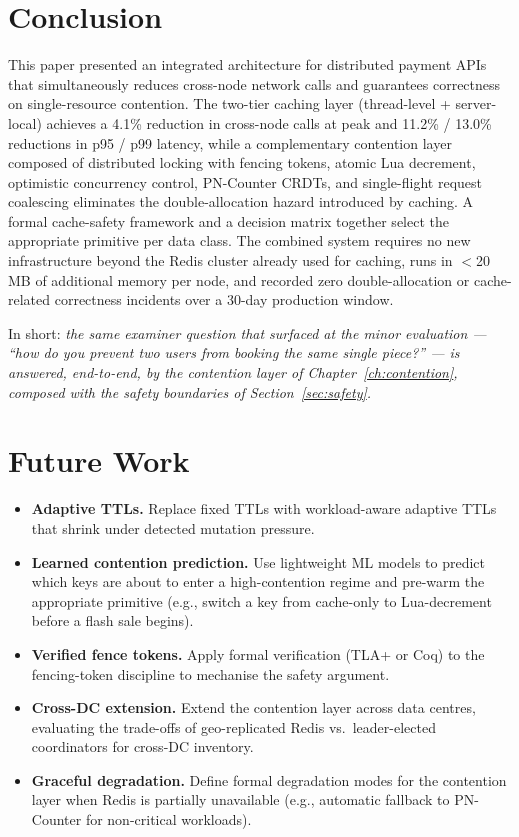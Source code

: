 \section{Conclusion}
This paper presented an integrated architecture for distributed payment APIs that simultaneously reduces cross-node network calls and guarantees correctness on single-resource contention. The two-tier caching layer (thread-level + server-local) achieves a 4.1\% reduction in cross-node calls at peak and 11.2\% / 13.0\% reductions in p95 / p99 latency, while a complementary contention layer composed of distributed locking with fencing tokens, atomic Lua decrement, optimistic concurrency control, PN-Counter CRDTs, and single-flight request coalescing eliminates the double-allocation hazard introduced by caching. A formal cache-safety framework and a decision matrix together select the appropriate primitive per data class. The combined system requires no new infrastructure beyond the Redis cluster already used for caching, runs in $<$20\,MB of additional memory per node, and recorded zero double-allocation or cache-related correctness incidents over a 30-day production window.

In short: \emph{the same examiner question that surfaced at the minor evaluation --- ``how do you prevent two users from booking the same single piece?'' --- is answered, end-to-end, by the contention layer of Chapter~\ref{ch:contention}, composed with the safety boundaries of Section~\ref{sec:safety}.}

\section{Future Work}
\begin{itemize}[leftmargin=*]
    \item \textbf{Adaptive TTLs.} Replace fixed TTLs with workload-aware adaptive TTLs that shrink under detected mutation pressure.
    \item \textbf{Learned contention prediction.} Use lightweight ML models to predict which keys are about to enter a high-contention regime and pre-warm the appropriate primitive (e.g., switch a key from cache-only to Lua-decrement before a flash sale begins).
    \item \textbf{Verified fence tokens.} Apply formal verification (TLA+ or Coq) to the fencing-token discipline to mechanise the safety argument.
    \item \textbf{Cross-DC extension.} Extend the contention layer across data centres, evaluating the trade-offs of geo-replicated Redis vs.\ leader-elected coordinators for cross-DC inventory.
    \item \textbf{Graceful degradation.} Define formal degradation modes for the contention layer when Redis is partially unavailable (e.g., automatic fallback to PN-Counter for non-critical workloads).
\end{itemize}

